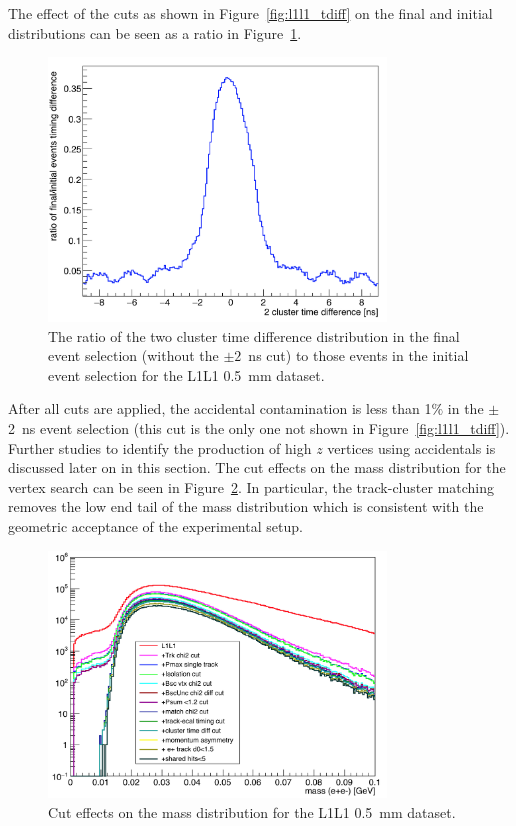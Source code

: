 The effect of the cuts as shown in Figure~\ref{fig:l1l1_tdiff} on the final and initial distributions can be seen as a ratio in Figure~\ref{fig:l1l1_tdiffR}.

\begin{figure}[H]
  \centering
      \includegraphics[width=0.8\textwidth]{pics/searching/ratio_tdiff_cuts.png}
  \caption{The ratio of the two cluster time difference distribution in the final event selection (without the $\pm2$~ns cut) to those events in the initial event selection for the L1L1 0.5~mm dataset.}
  \label{fig:l1l1_tdiffR}
\end{figure}

After all cuts are applied, the accidental contamination is less than 1$\%$ in the $\pm$ 2~ns event selection (this cut is the only one not shown in Figure~\ref{fig:l1l1_tdiff}). Further studies to identify the production of high $z$ vertices using accidentals is discussed later on in this section. The cut effects on the mass distribution for the vertex search can be seen in Figure~\ref{fig:l1l1_mass}. In particular, the track-cluster matching removes the low end tail of the mass distribution which is consistent with the geometric acceptance of the experimental setup.

\begin{figure}[H]
  \centering
      \includegraphics[width=0.8\textwidth]{pics/searching/mass_L1L1_cuts.png}
  \caption{Cut effects on the mass distribution for the L1L1 0.5~mm dataset.}
  \label{fig:l1l1_mass}
\end{figure} 

